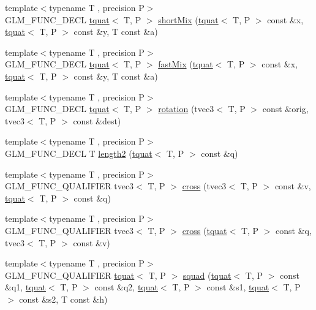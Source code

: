 \begin{DoxyCompactItemize}
\item 
{\footnotesize template$<$typename T , precision P$>$ }\\G\+L\+M\+\_\+\+F\+U\+N\+C\+\_\+\+D\+E\+C\+L \hyperlink{structglm_1_1tquat}{tquat}$<$ T, P $>$ \hyperlink{group__gtx__quaternion_ga3534443de2a1a806f386976546cddc81}{short\+Mix} (\hyperlink{structglm_1_1tquat}{tquat}$<$ T, P $>$ const \&x, \hyperlink{structglm_1_1tquat}{tquat}$<$ T, P $>$ const \&y, T const \&a)
\item 
{\footnotesize template$<$typename T , precision P$>$ }\\G\+L\+M\+\_\+\+F\+U\+N\+C\+\_\+\+D\+E\+C\+L \hyperlink{structglm_1_1tquat}{tquat}$<$ T, P $>$ \hyperlink{group__gtx__quaternion_gac11bf550f17d1da14423595a27575084}{fast\+Mix} (\hyperlink{structglm_1_1tquat}{tquat}$<$ T, P $>$ const \&x, \hyperlink{structglm_1_1tquat}{tquat}$<$ T, P $>$ const \&y, T const \&a)
\item 
{\footnotesize template$<$typename T , precision P$>$ }\\G\+L\+M\+\_\+\+F\+U\+N\+C\+\_\+\+D\+E\+C\+L \hyperlink{structglm_1_1tquat}{tquat}$<$ T, P $>$ \hyperlink{group__gtx__quaternion_gac4856d356c5c97cec74e9b672ea89240}{rotation} (tvec3$<$ T, P $>$ const \&orig, tvec3$<$ T, P $>$ const \&dest)
\item 
{\footnotesize template$<$typename T , precision P$>$ }\\G\+L\+M\+\_\+\+F\+U\+N\+C\+\_\+\+D\+E\+C\+L T \hyperlink{group__gtx__quaternion_ga02b45352c7ac345cabc9e877314acda6}{length2} (\hyperlink{structglm_1_1tquat}{tquat}$<$ T, P $>$ const \&q)
\item 
{\footnotesize template$<$typename T , precision P$>$ }\\G\+L\+M\+\_\+\+F\+U\+N\+C\+\_\+\+Q\+U\+A\+L\+I\+F\+I\+E\+R tvec3$<$ T, P $>$ \hyperlink{group__gtx__quaternion_ga4bfe3c7770fc43d14b8ef0058c4a86b5}{cross} (tvec3$<$ T, P $>$ const \&v, \hyperlink{structglm_1_1tquat}{tquat}$<$ T, P $>$ const \&q)
\item 
{\footnotesize template$<$typename T , precision P$>$ }\\G\+L\+M\+\_\+\+F\+U\+N\+C\+\_\+\+Q\+U\+A\+L\+I\+F\+I\+E\+R tvec3$<$ T, P $>$ \hyperlink{group__gtx__quaternion_ga33ecf8ba903eee5fc09f0fbfc0d5ca6b}{cross} (\hyperlink{structglm_1_1tquat}{tquat}$<$ T, P $>$ const \&q, tvec3$<$ T, P $>$ const \&v)
\item 
{\footnotesize template$<$typename T , precision P$>$ }\\G\+L\+M\+\_\+\+F\+U\+N\+C\+\_\+\+Q\+U\+A\+L\+I\+F\+I\+E\+R \hyperlink{structglm_1_1tquat}{tquat}$<$ T, P $>$ \hyperlink{group__gtx__quaternion_gae75f537becdf2b1381b4482ec96e6c82}{squad} (\hyperlink{structglm_1_1tquat}{tquat}$<$ T, P $>$ const \&q1, \hyperlink{structglm_1_1tquat}{tquat}$<$ T, P $>$ const \&q2, \hyperlink{structglm_1_1tquat}{tquat}$<$ T, P $>$ const \&s1, \hyperlink{structglm_1_1tquat}{tquat}$<$ T, P $>$ const \&s2, T const \&h)

\end{DoxyCompactItemize}
